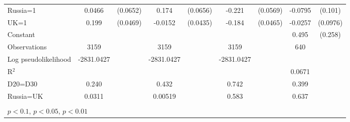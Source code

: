 \begin{tabular}{l|cccccc|cc}
Russia=1        &   0.0466         & (0.0652)&    0.174\sym{***}& (0.0656)&   -0.221\sym{***}& (0.0569)&  -0.0795         &  (0.101)\\
UK=1            &    0.199\sym{***}& (0.0469)&  -0.0152         & (0.0435)&   -0.184\sym{***}& (0.0465)&  -0.0257         & (0.0976)\\
Constant        &                  &         &                  &         &                  &         &    0.495\sym{*}  &  (0.258)\\
\hline
Observations    &     3159         &         &     3159         &         &     3159         &         &      640         &         \\

Log pseudolikelihood  & -2831.0427   &         &     -2831.0427             &         &    -2831.0427              &         &           &   \\ 
R$^2$      &                  &         &                  &         &                  &         &       0.0671    &   \\ 
D20=D30         &    0.240         &         &    0.432         &         &    0.742         &         &    0.399         &         \\
Russia=UK       &   0.0311         &         &  0.00519         &         &    0.583         &         &    0.637         &         \\
\hline\hline
\multicolumn{9}{p{16cm}}{\tiny }\\
\multicolumn{9}{l}{\tiny \sym{*} \(p<0.1\), \sym{**} \(p<0.05\), \sym{***} \(p<0.01\)}\\
\end{tabular}